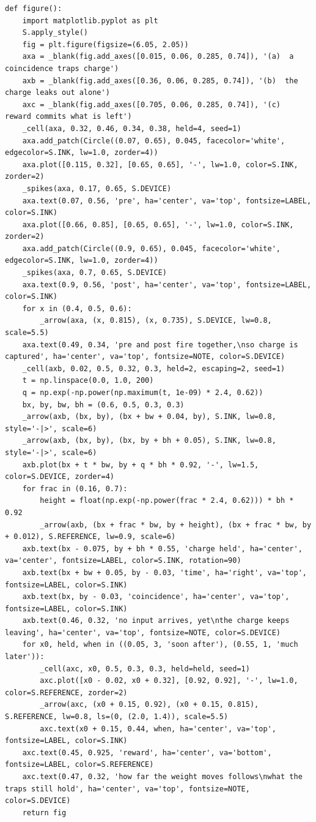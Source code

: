 \documentclass[a4paper,10pt]{article}
\begin{document}
\begin{Verbatim}
def figure():
    import matplotlib.pyplot as plt
    S.apply_style()
    fig = plt.figure(figsize=(6.05, 2.05))
    axa = _blank(fig.add_axes([0.015, 0.06, 0.285, 0.74]), '(a)  a coincidence traps charge')
    axb = _blank(fig.add_axes([0.36, 0.06, 0.285, 0.74]), '(b)  the charge leaks out alone')
    axc = _blank(fig.add_axes([0.705, 0.06, 0.285, 0.74]), '(c)  reward commits what is left')
    _cell(axa, 0.32, 0.46, 0.34, 0.38, held=4, seed=1)
    axa.add_patch(Circle((0.07, 0.65), 0.045, facecolor='white', edgecolor=S.INK, lw=1.0, zorder=4))
    axa.plot([0.115, 0.32], [0.65, 0.65], '-', lw=1.0, color=S.INK, zorder=2)
    _spikes(axa, 0.17, 0.65, S.DEVICE)
    axa.text(0.07, 0.56, 'pre', ha='center', va='top', fontsize=LABEL, color=S.INK)
    axa.plot([0.66, 0.85], [0.65, 0.65], '-', lw=1.0, color=S.INK, zorder=2)
    axa.add_patch(Circle((0.9, 0.65), 0.045, facecolor='white', edgecolor=S.INK, lw=1.0, zorder=4))
    _spikes(axa, 0.7, 0.65, S.DEVICE)
    axa.text(0.9, 0.56, 'post', ha='center', va='top', fontsize=LABEL, color=S.INK)
    for x in (0.4, 0.5, 0.6):
        _arrow(axa, (x, 0.815), (x, 0.735), S.DEVICE, lw=0.8, scale=5.5)
    axa.text(0.49, 0.34, 'pre and post fire together,\nso charge is captured', ha='center', va='top', fontsize=NOTE, color=S.DEVICE)
    _cell(axb, 0.02, 0.5, 0.32, 0.3, held=2, escaping=2, seed=1)
    t = np.linspace(0.0, 1.0, 200)
    q = np.exp(-np.power(np.maximum(t, 1e-09) * 2.4, 0.62))
    bx, by, bw, bh = (0.6, 0.5, 0.3, 0.3)
    _arrow(axb, (bx, by), (bx + bw + 0.04, by), S.INK, lw=0.8, style='-|>', scale=6)
    _arrow(axb, (bx, by), (bx, by + bh + 0.05), S.INK, lw=0.8, style='-|>', scale=6)
    axb.plot(bx + t * bw, by + q * bh * 0.92, '-', lw=1.5, color=S.DEVICE, zorder=4)
    for frac in (0.16, 0.7):
        height = float(np.exp(-np.power(frac * 2.4, 0.62))) * bh * 0.92
        _arrow(axb, (bx + frac * bw, by + height), (bx + frac * bw, by + 0.012), S.REFERENCE, lw=0.9, scale=6)
    axb.text(bx - 0.075, by + bh * 0.55, 'charge held', ha='center', va='center', fontsize=LABEL, color=S.INK, rotation=90)
    axb.text(bx + bw + 0.05, by - 0.03, 'time', ha='right', va='top', fontsize=LABEL, color=S.INK)
    axb.text(bx, by - 0.03, 'coincidence', ha='center', va='top', fontsize=LABEL, color=S.INK)
    axb.text(0.46, 0.32, 'no input arrives, yet\nthe charge keeps leaving', ha='center', va='top', fontsize=NOTE, color=S.DEVICE)
    for x0, held, when in ((0.05, 3, 'soon after'), (0.55, 1, 'much later')):
        _cell(axc, x0, 0.5, 0.3, 0.3, held=held, seed=1)
        axc.plot([x0 - 0.02, x0 + 0.32], [0.92, 0.92], '-', lw=1.0, color=S.REFERENCE, zorder=2)
        _arrow(axc, (x0 + 0.15, 0.92), (x0 + 0.15, 0.815), S.REFERENCE, lw=0.8, ls=(0, (2.0, 1.4)), scale=5.5)
        axc.text(x0 + 0.15, 0.44, when, ha='center', va='top', fontsize=LABEL, color=S.INK)
    axc.text(0.45, 0.925, 'reward', ha='center', va='bottom', fontsize=LABEL, color=S.REFERENCE)
    axc.text(0.47, 0.32, 'how far the weight moves follows\nwhat the traps still hold', ha='center', va='top', fontsize=NOTE, color=S.DEVICE)
    return fig
\end{Verbatim}
\end{document}
